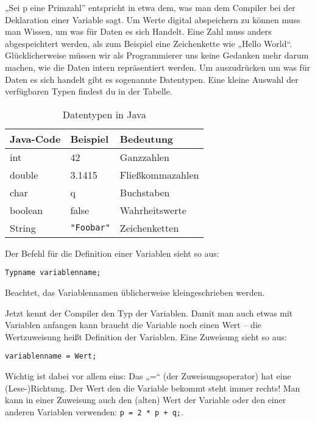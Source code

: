 „Sei p eine Primzahl” entspricht in etwa dem, was man dem Compiler bei der Deklaration einer Variable sagt. Um Werte digital abspeichern zu können muss man Wissen, um was für Daten es sich Handelt. Eine Zahl muss anders abgespeichtert werden, als zum Beispiel eine Zeichenkette wie „Hello World“.
Glücklicherweise müssen wir als Programmierer uns keine Gedanken mehr darum machen, wie die Daten intern repräsentiert werden.
Um auszudrücken um was für Daten es sich handelt gibt es sogenannte Datentypen. Eine kleine Auswahl der verfügbaren Typen findest du in der Tabelle.

\begin{table}
\centering
\begin{tabular}{l|l|l}
Java-Code & Beispiel & Bedeutung \\ \hline
int & 42 & Ganzzahlen \\
double & 3.1415 & Fließkommazahlen \\
char & q & Buchstaben \\
boolean & false & Wahrheitswerte \\
String & \lstinline$"Foobar"$ & Zeichenketten \\

\end{tabular}
\label{Datentypen}
\caption{Datentypen in Java}
\end{table}

Der Befehl für die Definition einer Variablen sieht so aus: 
\begin{lstlisting}
Typname variablenname;
\end{lstlisting}
Beachtet, das Variablennamen üblicherweise kleingeschrieben werden.

Jetzt kennt der Compiler den Typ der Variablen. 
Damit man auch etwas mit Variablen anfangen kann braucht die Variable noch einen Wert – die Wertzuweisung heißt Definition der Variablen.
Eine Zuweisung sieht so aus: 
\begin{lstlisting}
variablenname = Wert;
\end{lstlisting}
Wichtig ist dabei vor allem eins: Das „=“ (der Zuweisungsoperator) hat eine (Lese-)Richtung. Der Wert den die Variable bekommt steht immer rechts!
Man kann in einer Zuweisung auch den (alten) Wert der Variable oder den einer anderen Variablen verwenden: \lstinline$p = 2 * p + q;$.

